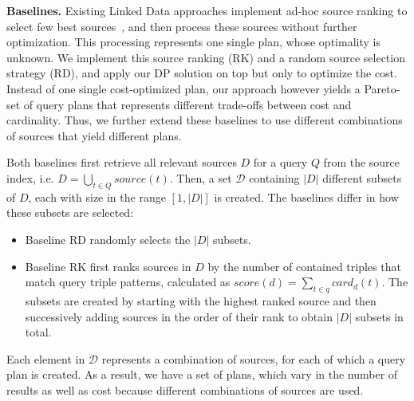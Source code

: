 \textbf{Baselines.} Existing Linked Data approaches implement ad-hoc
source ranking to select few best
sources~\cite{harth_data_2010,ladwig_linked_2010}, and then process
these sources without further optimization. This processing represents
one single plan, whose optimality is unknown. We implement this source
ranking (RK) and a random source selection strategy (RD), and 
apply our DP solution on top but only to
optimize the cost. 
Instead of one
single cost-optimized plan, our approach however yields a Pareto-set
of query plans that represents different trade-offs between cost and
cardinality. Thus, we further extend these baselines to use different
combinations of sources that yield different plans.

Both baselines first retrieve all relevant sources $D$ for a query $Q$
from the source index, i.e. $D = \bigcup_{t \in Q} source(t)$. Then,
a set $\mathcal{D}$ containing $|D|$ different subsets of $D$, each
with size in the range $[1,|D|]$ is created.
The baselines differ in how these
subsets are selected:
\begin{itemize}
\item Baseline RD randomly selects the $|D|$ subsets.
\item Baseline RK first ranks sources in $D$ by the number of
  contained triples that match query triple patterns, calculated as
  $score(d) = \sum_{t \in q} card_d(t)$. The subsets are created by
  starting with the highest ranked source and then successively adding
  sources in the order of their rank to obtain $|D|$ subsets in total.
\end{itemize}
Each element in $\mathcal{D}$ represents a combination of sources, for
each of which a query plan is created. As a result, we have a set of
plans, which vary in the number of results as well as cost because
different combinations of sources are used.

